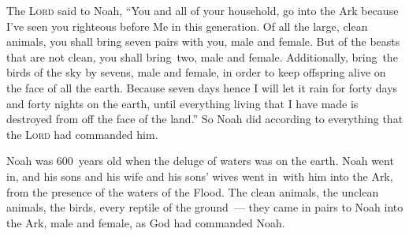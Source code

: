 
\begin{inparaenum}
     The \textsc{Lord} said to Noah, ``You and all of your household, go into the Ark because I've seen you righteous before Me in this generation.%
     Of all the large, clean animals, you shall bring seven pairs with you, male and female. But of the beasts that are not clean, you shall bring\understood\ two, male and female.%
     Additionally, bring\understood\ the birds of the sky by sevens, male and female, in order to keep offspring alive on the face of all the earth.%
     Because seven days hence I will let it rain for forty days and forty nights on the earth, until everything living that I have made is destroyed from off the face of the land.''%
     So Noah did according to everything that the \textsc{Lord} had commanded him.%
    
     Noah was 600~years old when the deluge of waters was on the earth.%
     Noah went in, and his sons and his wife and his sons' wives went in\understood\ with him into the Ark, from the presence of the waters of the Flood.%
     The clean animals, the unclean animals, the birds, every reptile of the ground~---%
     they came in pairs to Noah into the Ark, male and female, as God had commanded Noah.%
\end{inparaenum}
